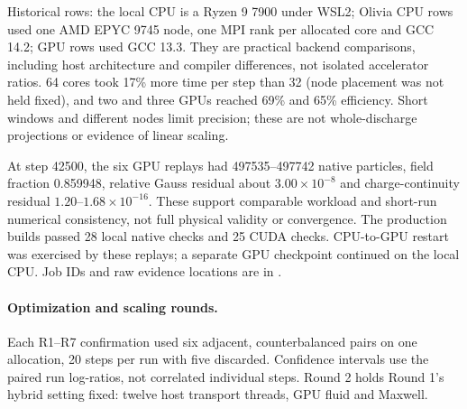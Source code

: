 \documentclass[11pt]{article}
\begin{document}
Historical rows: the local CPU is a Ryzen 9 7900 under WSL2; Olivia CPU rows
used one AMD EPYC 9745 node, one MPI rank per allocated core and GCC 14.2;
GPU rows used GCC 13.3. They are practical backend comparisons, including host
architecture and compiler differences, not isolated accelerator ratios.
64 cores took 17\% more time per step than 32 (node placement was not held
fixed), and two and three GPUs reached 69\% and 65\% efficiency. Short windows
and different nodes limit precision; these are not whole-discharge
projections or evidence of linear scaling.

At step 42500, the six GPU replays had 497535--497742 native particles,
field fraction 0.859948, relative Gauss residual about $3.00\times10^{-8}$
and charge-continuity residual $1.20$--$1.68\times10^{-16}$. These support
comparable workload and short-run numerical consistency, not full physical
validity or convergence. The production builds passed 28 local native checks
and 25 CUDA checks. CPU-to-GPU restart was exercised by these replays;
a separate GPU checkpoint continued on the local CPU. Job IDs and raw evidence
locations are in .

\paragraph{Optimization and scaling rounds.}
Each R1--R7 confirmation used six adjacent, counterbalanced pairs on one allocation,
20 steps per run with five discarded. Confidence intervals use the paired
run log-ratios, not correlated individual steps. Round 2 holds Round 1's
hybrid setting fixed: twelve host transport threads, GPU fluid and Maxwell.
\end{document}

